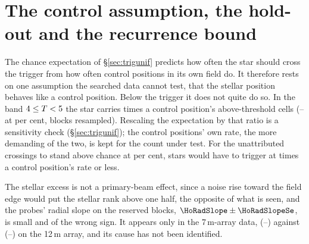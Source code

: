 \section{The control assumption, the hold-out and the recurrence bound}
\label{app:radius}

The chance expectation of \S\ref{sec:trigunif} predicts how often the star
should cross the trigger from how often control positions in its own field
do. It therefore rests on one assumption the searched data cannot test,
that the stellar position behaves like a control position. Below the trigger it does
not quite do so. In the band $4\le T<5$ the star
carries \CeNear{} times a control position's above-threshold cells
(\CeNearIntLo--\CeNearIntHi{} at \CeCovPct{} per cent, blocks resampled).
Rescaling the expectation by that ratio is a sensitivity check
(\S\ref{sec:trigunif}); the control positions' own rate, the more demanding
of the two, is kept for the count under test. For the \CeObs{}
unattributed crossings to stand above chance at \CeAlphaPct{} per cent, stars
would have to trigger at \CeRCrit{} times a control position's rate or less.

The stellar excess is not a primary-beam effect, since a noise rise toward the field
edge would put the stellar rank above one half, the opposite of what is
seen, and the probes' radial slope on the reserved blocks,
$\HoRadSlope\pm\HoRadSlopeSe$, is small and of the wrong sign. It appears
only in the 7\,m-array data, \BgArrSevenRatio{}
(\BgArrSevenRatioLo--\BgArrSevenRatioHi) against \BgArrTwelveRatio{}
(\BgArrTwelveRatioLo--\BgArrTwelveRatioHi) on the 12\,m array, and its cause
has not been identified.


